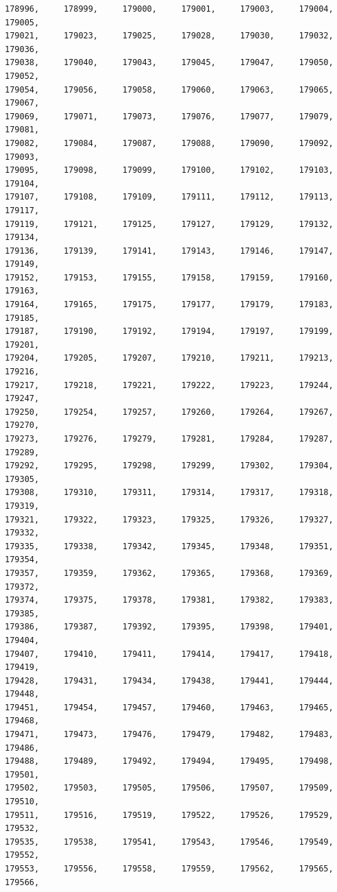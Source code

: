 \documentclass[a4paper,11pt]{report}
\begin{document}
\begin{verbatim}
178996,     178999,     179000,     179001,     179003,     179004,     179005,
179021,     179023,     179025,     179028,     179030,     179032,     179036,
179038,     179040,     179043,     179045,     179047,     179050,     179052,
179054,     179056,     179058,     179060,     179063,     179065,     179067,
179069,     179071,     179073,     179076,     179077,     179079,     179081,
179082,     179084,     179087,     179088,     179090,     179092,     179093,
179095,     179098,     179099,     179100,     179102,     179103,     179104,
179107,     179108,     179109,     179111,     179112,     179113,     179117,
179119,     179121,     179125,     179127,     179129,     179132,     179134,
179136,     179139,     179141,     179143,     179146,     179147,     179149,
179152,     179153,     179155,     179158,     179159,     179160,     179163,
179164,     179165,     179175,     179177,     179179,     179183,     179185,
179187,     179190,     179192,     179194,     179197,     179199,     179201,
179204,     179205,     179207,     179210,     179211,     179213,     179216,
179217,     179218,     179221,     179222,     179223,     179244,     179247,
179250,     179254,     179257,     179260,     179264,     179267,     179270,
179273,     179276,     179279,     179281,     179284,     179287,     179289,
179292,     179295,     179298,     179299,     179302,     179304,     179305,
179308,     179310,     179311,     179314,     179317,     179318,     179319,
179321,     179322,     179323,     179325,     179326,     179327,     179332,
179335,     179338,     179342,     179345,     179348,     179351,     179354,
179357,     179359,     179362,     179365,     179368,     179369,     179372,
179374,     179375,     179378,     179381,     179382,     179383,     179385,
179386,     179387,     179392,     179395,     179398,     179401,     179404,
179407,     179410,     179411,     179414,     179417,     179418,     179419,
179428,     179431,     179434,     179438,     179441,     179444,     179448,
179451,     179454,     179457,     179460,     179463,     179465,     179468,
179471,     179473,     179476,     179479,     179482,     179483,     179486,
179488,     179489,     179492,     179494,     179495,     179498,     179501,
179502,     179503,     179505,     179506,     179507,     179509,     179510,
179511,     179516,     179519,     179522,     179526,     179529,     179532,
179535,     179538,     179541,     179543,     179546,     179549,     179552,
179553,     179556,     179558,     179559,     179562,     179565,     179566,

\end{verbatim}
\end{document}
